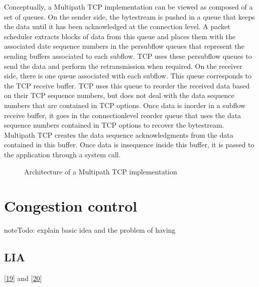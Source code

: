 \documentclass[letterpaper,10pt,english]{sphinxmanual}
\begin{document}
Conceptually, a Multipath TCP implementation can be viewed as composed of a set of queues. On the sender side, the bytestream is pushed in a queue that keeps the data until it has been acknowledged at the connection level. A packet scheduler extracts blocks of data from this queue and places them with the associated date sequence numbers in the per\sphinxhyphen{}subflow queues that represent the sending buffers associated to each subflow. TCP uses these per\sphinxhyphen{}subflow queues to send the data and perform the retransmission when required. On the receiver side, there is one queue associated with each subflow. This queue corresponds to the TCP receive buffer. TCP uses this queue to reorder the received data based on their TCP sequence numbers, but does not deal with the data sequence numbers that are contained in TCP options. Once data is in\sphinxhyphen{}order in a subflow receive buffer, it goes in the connection\sphinxhyphen{}level reorder queue that uses the data sequence numbers contained in TCP options to recover the bytestream. Multipath TCP creates the data sequence acknowledgments from the data contained in this buffer. Once data is in\sphinxhyphen{}sequence inside this buffer, it is passed to the application through a  system call.
\begin{figure}[htbp]\centering\capstart{}\caption{Architecture of a Multipath TCP implementation}\label{\detokenize{mptcp:id72}}\end{figure}

\section{Congestion control}
\label{\detokenize{mptcp:congestion-control}}\label{\detokenize{mptcp:mptcp-congestion}}
\begin{sphinxadmonition}{note}{\label{\detokenize{mptcp:id27}}Todo:}
\sphinxAtStartPar
explain basic idea and the problem of having
\end{sphinxadmonition}


\subsection{LIA}
\label{\detokenize{mptcp:lia}}
\sphinxAtStartPar
{[}\hyperlink{cite.biblio:id8932}{19}{]} and {[}\hyperlink{cite.biblio:id6203}{20}{]}
\end{document}
